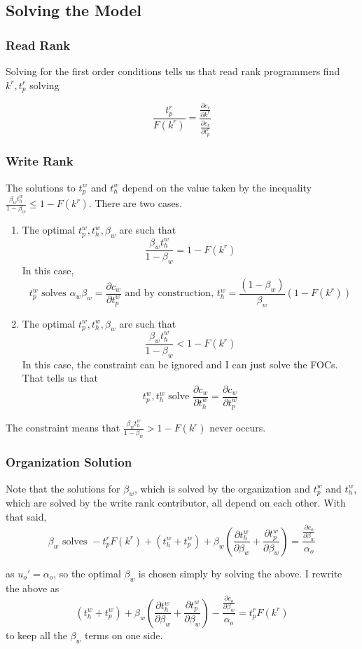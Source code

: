 \documentclass[12pt,notitlepage]{article}
\begin{document}
\subsection{Solving the Model}
\subsubsection{Read Rank}
Solving for the first order conditions tells us that read rank programmers find $k^r, t_p^r$ solving 


$$\frac{t_p^r}{F(k^r)} = \frac{\frac{\partial c_r}{\partial k^r}}{\frac{\partial c_r}{\partial t_p^r}}$$
\subsubsection{Write Rank}
The solutions to $t_p^w$ and $t_h^w$ depend on the value taken by the inequality $\frac{\beta_w t_h^w}{1-\beta_w} \leq 1-F(k^r)$. There are two cases.
\begin{enumerate}
    \item The optimal $t_p^w, t_h^w, \beta_w$ are such that
    $$\frac{\beta_w t_h^w}{1-\beta_w} = 1-F(k^r)$$
    In this case, 
    $$t_p^w \text{ solves } \alpha_w \beta_w = \frac{\partial c_w}{\partial t_p^w} \text{ and by construction, } t_h^w = \frac{(1-\beta_w)}{\beta_w} (1 -F(k^r))$$
    \item The optimal $t_p^w, t_h^w, \beta_w$ are such that
    $$\frac{\beta_w t_h^w}{1-\beta_w} < 1-F(k^r)$$
    In this case, the constraint can be ignored and I can just solve the FOCs. That tells us that 
    $$t_p^w, t_h^w \text{ solve } \frac{\partial c_w}{\partial t_h^w} = \frac{\partial c_w}{\partial t_p^w}$$
\end{enumerate}

The constraint means that $\frac{\beta_w t_h^w}{1-\beta_w} > 1-F(k^r)$ never occurs. 
\subsubsection{Organization Solution}
Note that the solutions for $\beta_w$, which is solved by the organization and $t_p^w$ and $t_h^w$, which are solved by the write rank contributor, all depend on each other. With that said, 
$$\beta_w \text{ solves } -t_p^rF(k^r) + (t_h^w + t_p^w) + \beta_w\left(\frac{\partial t_h^w}{\partial \beta_w} + \frac{\partial t_p^w}{\partial \beta_w}\right) = \frac{\frac{\partial c_o}{\partial \beta_w}}{\alpha_o}$$

as $u_o' = \alpha_o$, so the optimal $\beta_w$ is chosen simply by solving the above. I rewrite the above as 
$$ (t_h^w + t_p^w) + \beta_w\left(\frac{\partial t_h^w}{\partial \beta_w} + \frac{\partial t_p^w}{\partial \beta_w}\right) - \frac{\frac{\partial c_o}{\partial \beta_w}}{\alpha_o} = t_p^rF(k^r)$$
to keep all the $\beta_w$ terms on one side. 
\end{document}
